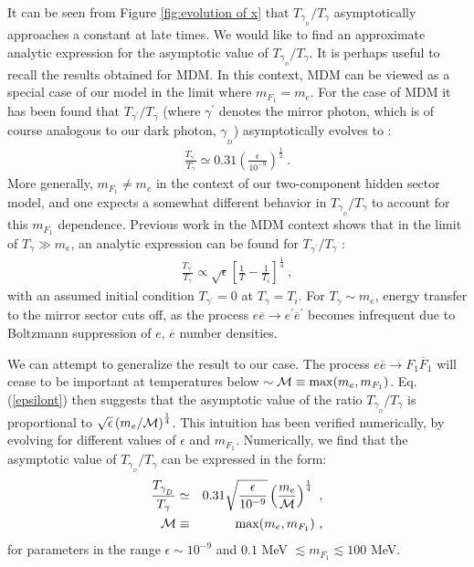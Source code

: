 \documentclass[12pt]{article}
\begin{document}

It can be seen from Figure \ref{fig:evolution of x} that $T _{\gamma
_{_D}}/T _{\gamma}$ asymptotically approaches a constant at late times.
We would like to find an approximate analytic expression for the
asymptotic value of $T _{\gamma _{_D}}/T _{\gamma}$. It is perhaps
useful to recall the results obtained for MDM. In this context, MDM can
be viewed as a special case of our model in the limit where $m _{F_1} =
m _e$. For the case of MDM it has been found that $T _{{\gamma} ^{'}}/T
_{\gamma}$ (where $\gamma ^{'}$ denotes the mirror photon, which is of
course analogous to our dark photon, $\gamma _{_D}$) asymptotically
evolves to \cite{predictions}:
%
\begin{eqnarray}
\frac{T _{{\gamma} ^{'}}}{T _{\gamma}} \simeq 0.31 \left (
\frac{\epsilon}{10^{-9}} \right ) ^{\frac{1}{2}} \ .
\label{xmirror}
\end{eqnarray}
%
More generally, $m _{F_1} \neq m _e$ in the context of our two-component
hidden sector model, and one expects a somewhat different behavior in $T
_{\gamma _{_D}}/T _{\gamma}$ to account for this $m _{F_1}$ dependence.
Previous work in the MDM context shows that in the limit of $T _{\gamma}
\gg m _e$, an analytic expression can be found for $T _{{\gamma} ^{'}}/T
_{\gamma}$ \cite{ciarcellutiliege}:
%
\begin{eqnarray}
\frac{T _{{\gamma} ^{'}}}{T _{\gamma}} \propto \sqrt{\epsilon} \left [
\frac{1}{T} - \frac{1}{T_i} \right ] ^{\frac{1}{4}} \ ,
\label{epsilont}
\end{eqnarray}
%
with an assumed initial condition $T _{{\gamma} ^{'}} = 0$ at $T
_{\gamma} = T_i$. For $T _{\gamma} \sim m _e$, energy transfer to the
mirror sector cuts off, as the process $e\overline{e} \rightarrow e
^{'}\overline{e} ^{'}$ becomes infrequent due to Boltzmann suppression
of $e$, $\overline{e}$ number densities.

We can attempt to generalize the result to our case. The process
$e\overline{e} \rightarrow F _1\overline{F} _1$ will cease to be
important at temperatures below $\sim {\cal M} \equiv \max (m _e , m
_{F_1})$. Eq.(\ref{epsilont}) then suggests that the asymptotic value of
the ratio $T _{\gamma _{_D}}/T _{\gamma}$ is proportional to
$\sqrt{\epsilon} \left (m _e/{\cal M} \right ) ^{\frac{1}{4}}$. This
intuition has been verified numerically, by evolving for different
values of $\epsilon$ and $m _{F_1}$. Numerically, we find that the
asymptotic value of $T _{\gamma _{_D}}/T _{\gamma}$ can be expressed in
the form:
%
\begin{eqnarray}
\frac{T _{\gamma _{_D}}}{T _{\gamma}} & \simeq & 0.31
\sqrt{\frac{\epsilon}{10^{-9}}} \left (\frac{m _e}{{\cal M}} \right )
^{\frac{1}{4}} \ , \nonumber \\
{\cal M} & \equiv & \max (m _e, m _{F_1}) \ ,
\label{masterformula}
\end{eqnarray}
%
for parameters in the range $\epsilon \sim 10 ^{-9}$ and $0.1$ MeV
$\lesssim m _{F_1} \lesssim 100$ MeV.
\end{document}
